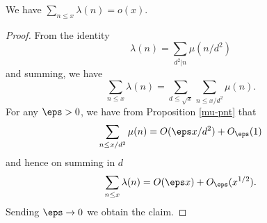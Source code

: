 \begin{proposition}
\label{lambda-pnt}
\leanok
We have $\sum_{n \leq x} \lambda(n) = o(x)$.
\end{proposition}
\begin{proof}
\leanok
From the identity
    $$ \lambda(n) = \sum_{d^2|n} \mu(n/d^2)$$
  and summing, we have
  $$ \sum_{n \leq x} \lambda(n) = \sum_{d \leq \sqrt{x}} \sum_{n \leq x/d^2} \mu(n).$$
  For any $\eps>0$, we have from Proposition \ref{mu-pnt} that
  $$ \sum_{n \leq x/d^2} \mu(n) = O(\eps x/d^2) + O_\eps(1)$$
  and hence on summing in $d$
  $$ \sum_{n \leq x} \lambda(n) = O(\eps x) + O_\eps(x^{1/2}).$$
  Sending $\eps \to 0$ we obtain the claim.
\end{proof}
